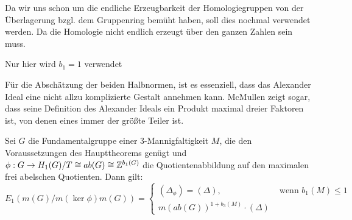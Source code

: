 Da wir uns schon um die endliche Erzeugbarkeit der Homologiegruppen von der Überlagerung bzgl. dem Gruppenring bemüht haben, soll dies nochmal verwendet werden. Da die Homologie nicht endlich erzeugt über den ganzen Zahlen sein muss.


Nur hier wird $b_1=1$ verwendet
    
    Für die Abschätzung der beiden Halbnormen, ist es essenziell, dass das Alexander Ideal eine nicht allzu komplizierte Gestalt annehmen kann. McMullen zeigt \cite{McMullen2002} sogar, dass seine Definition des Alexander Ideals ein Produkt maximal dreier Faktoren ist, von denen eines immer der größte Teiler ist. 

\begin{thm}
	Sei $G$ die Fundamentalgruppe einer 3-Mannigfaltigkeit $M$, die den Voraussetzungen des Haupttheorems genügt und $\phi:G \to H_1(G)/T \cong ab(G) \cong \mathbb{Z}^{b_1(G)}$ die Quotientenabbildung auf den maximalen frei abelschen Quotienten. Dann gilt:
	\[
		E_1(m(G)/m(\ker\phi)m(G)) = 
				\begin{cases}
    				(\Delta_\phi)=(\Delta) , &\text{ wenn } b_1(M)\leq 1\\
    				m(ab(G))^{1+b_3(M)}\cdot (\Delta) & 
    			\end{cases}
	\]
\end{thm}